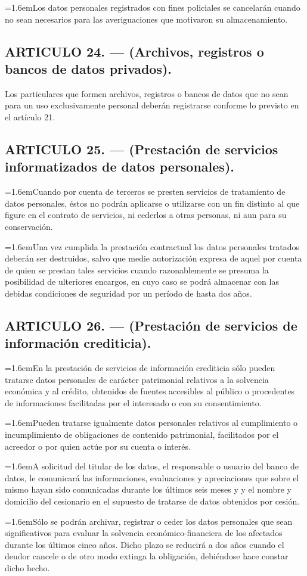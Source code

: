 \documentclass[10pt,a4paper]{article}
\newcommand{\articulo}[1]{\subsection{#1}}
\newcommand{\inciso}[2]{\par{\hangindent=1.6em\hangafter=1\makebox[1.6em][l]{#1}#2\par}}
\begin{document}
\inciso{3.}{Los datos personales registrados con fines policiales se cancelarán cuando no sean necesarios para las averiguaciones que motivaron su almacenamiento.}

\articulo{ARTICULO 24. — (Archivos, registros o bancos de datos privados).}
Los particulares que formen archivos, registros o bancos de datos que no sean para un uso exclusivamente personal deberán registrarse conforme lo previsto en el artículo 21.

\articulo{ARTICULO 25. — (Prestación de servicios informatizados de datos personales).}
\inciso{1.}{Cuando por cuenta de terceros se presten servicios de tratamiento de datos personales, éstos no podrán aplicarse o utilizarse con un fin distinto al que figure en el contrato de servicios, ni cederlos a otras personas, ni aun para su conservación.}

\inciso{2.}{Una vez cumplida la prestación contractual los datos personales tratados deberán ser destruidos, salvo que medie autorización expresa de aquel por cuenta de quien se prestan tales servicios cuando razonablemente se presuma la posibilidad de ulteriores encargos, en cuyo caso se podrá almacenar con las debidas condiciones de seguridad por un período de hasta dos años.}

\articulo{ARTICULO 26. — (Prestación de servicios de información crediticia).}
\inciso{1.}{En la prestación de servicios de información crediticia sólo pueden tratarse datos personales de carácter patrimonial relativos a la solvencia económica y al crédito, obtenidos de fuentes accesibles al público o procedentes de informaciones facilitadas por el interesado o con su consentimiento.}

\inciso{2.}{Pueden tratarse igualmente datos personales relativos al cumplimiento o incumplimiento de obligaciones de contenido patrimonial, facilitados por el acreedor o por quien actúe por su cuenta o interés.}

\inciso{3.}{A solicitud del titular de los datos, el responsable o usuario del banco de datos, le comunicará las informaciones, evaluaciones y apreciaciones que sobre el mismo hayan sido comunicadas durante los últimos seis meses y y el nombre y domicilio del cesionario en el supuesto de tratarse de datos obtenidos por cesión.}

\inciso{4.}{Sólo se podrán archivar, registrar o ceder los datos personales que sean significativos para evaluar la solvencia económico-financiera de los afectados durante los últimos cinco años. Dicho plazo se reducirá a dos años cuando el deudor cancele o de otro modo extinga la obligación, debiéndose hace constar dicho hecho.}
\end{document}
